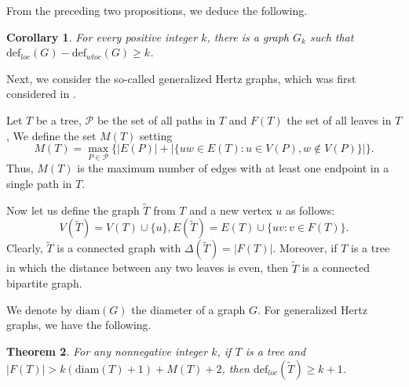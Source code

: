 \documentclass[12pt]{article}
\theoremstyle{plain}
\newtheorem{theorem}{Theorem}[section]
\newtheorem{corollary}[theorem]{Corollary}
\theoremstyle{definition}
\numberwithin{equation}{section}
\begin{document}
From the preceding two propositions, we deduce the following.

\begin{corollary}
	For every positive integer $k$, there is a graph $G_k$ such that $\mathrm{def}_{loc}(G) - \mathrm{def}_{wloc}(G) \geq k$.
\end{corollary}
	
	Next, we consider the so-called generalized Hertz graphs, which was first considered in \cite{PetrosHrant}.

Let $T$ be a tree, $\mathcal{P}$ be the set of all paths in $T$ and $F(T)$ the set of all leaves in $T$,
We define the set $M(T)$ setting
\begin{equation*}
M(T)=\max_{P \in \mathcal{P}} \{|E(P)| + |\{uw \in E(T) : u \in V(P),
w \notin V(P)\}|\}.
\end{equation*}
Thus,  $M(T)$ is the maximum
number of edges with at least one endpoint in a single path in $T$.

Now let us define the graph $\widetilde{T}$ from $T$ and a new vertex $u$ as follows:
$$V(\widetilde{T})=V(T)\cup \{u\},
E(\widetilde{T})=E(T)\cup \{uv:v\in F(T)\}.$$
Clearly, $\widetilde{T}$ is a connected graph with
$\Delta(\widetilde{T})=\vert F(T)\vert$. Moreover, if $T$ is a tree
in which the distance between any two leaves is even, then
$\widetilde{T}$ is a connected bipartite graph.

We denote by $\mathrm{diam}(G)$ the diameter of a graph $G$. For generalized Hertz graphs,
we have the following.

\begin{theorem}
\label{trees} For any nonnegative integer $k$, if $T$ is a tree and $\vert F(T)\vert >
k(\mathrm{diam}(T)+1)+M(T)+2$, then $\mathrm{def}_{loc}(\widetilde{T})\geq k+1$.
\end{theorem}
\end{document}
